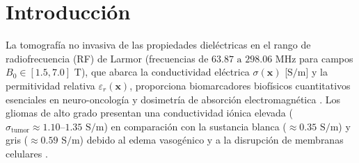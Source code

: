 \documentclass[9pt]{article}
\begin{document}
\section{Introducción}
\label{sec:introduccion}

La tomografía no invasiva de las propiedades dieléctricas en el rango de radiofrecuencia (RF) de Larmor (frecuencias de $63.87\text{ a }298.06\text{ MHz}$ para campos $B_0 \in [1.5, 7.0]\text{ T}$), que abarca la conductividad eléctrica $\sigma(\mathbf{x})$ [$\text{S/m}$] y la permitividad relativa $\varepsilon_r(\mathbf{x})$, proporciona biomarcadores biofísicos cuantitativos esenciales en neuro-oncología y dosimetría de absorción electromagnética \parencite{Gabriel1996, Katscher2009, Collins2011}. Los gliomas de alto grado presentan una conductividad iónica elevada ($\sigma_{\text{tumor}} \approx 1.10\text{--}1.35\text{ S/m}$) en comparación con la sustancia blanca ($\approx 0.35\text{ S/m}$) y gris ($\approx 0.59\text{ S/m}$) debido al edema vasogénico y a la disrupción de membranas celulares \parencite{Balidemaj2016, Tha2018}.
\end{document}
